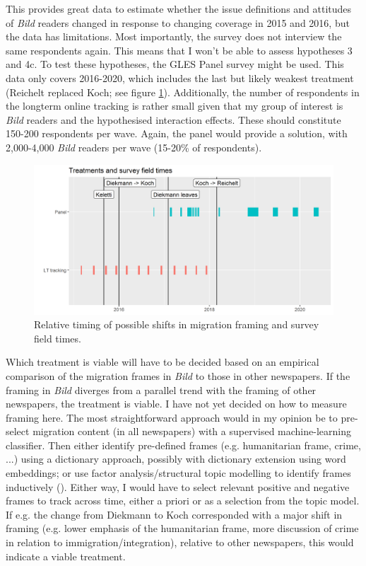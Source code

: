 \documentclass{article}
\begin{document}
This provides great data to estimate whether the issue definitions and attitudes of \textit{Bild} readers changed in response to changing coverage in 2015 and 2016, but the data has limitations. Most importantly, the survey does not interview the same respondents again. This means that I won't be able to assess hypotheses 3 and 4c. To test these hypotheses, the GLES Panel survey might be used. This data only covers 2016-2020, which includes the last but likely weakest treatment (Reichelt replaced Koch; see figure \ref{fig:gles}). Additionally, the number of respondents in the longterm online tracking is rather small given that my group of interest is \textit{Bild} readers and the hypothesised interaction effects. These should constitute 150-200 respondents per wave. Again, the panel would provide a solution, with 2,000-4,000 \textit{Bild} readers per wave (15-20\% of respondents).

\begin{figure}
    \centering
    \includegraphics[width=\textwidth]{pres/vis/gles_treatments.png}
    \caption{Relative timing of possible shifts in migration framing and survey field times.}
    \label{fig:gles}
\end{figure}

Which treatment is viable will have to be decided based on an empirical comparison of the migration frames in \textit{Bild} to those in other newspapers. If the framing in \textit{Bild} diverges from a parallel trend with the framing of other newspapers, the treatment is viable. I have not yet decided on how to measure framing here. The most straightforward approach would in my opinion be to pre-select migration content (in all newspapers) with a supervised machine-learning classifier. Then either identify pre-defined frames (e.g. humanitarian frame, crime, ...) using a dictionary approach, possibly with dictionary extension using word embeddings; or use factor analysis/structural topic modelling to identify frames inductively (\cite{Nicholls2020}). Either way, I would have to select relevant positive and negative frames to track across time, either a priori or as a selection from the topic model. If e.g. the change from Diekmann to Koch corresponded with a major shift in framing (e.g. lower emphasis of the humanitarian frame, more discussion of crime in relation to immigration/integration), relative to other newspapers, this would indicate a viable treatment.
\end{document}
